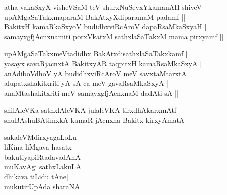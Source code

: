 \begin{entry}
\begin{shl}
atha vakaSxyX visheVSaM teV shurxNuSevxYkamanAH shiveV |\\
upAMgaSaTakxmaparaM BakAtxyXdiparamaM padamf ||\\
BakitxH kamaRkaSxyoV budidhxviRcAroV dapaRsaMkaSxyaH |\\
samayxgfjAcnxnamiti porxVkatxM sathxlaSaTakxM mama pirxyamf ||
\end{shl}
\begin{shl}
upAMgaSaTakxmeVtadidhx BakAtxdisathxlaSaTakxkamf |\\
yasayx savaRjacnxtA BakitxyAR taqpitxH kamaRsaMkaSxyA |\\
anAdiboVdhoV yA budidhxviRcAroV meV savxtaMtarxtA ||\\
alupatxshakitxriti yA sA ca meV gavaRsaMkaSxyA |\\
anaMtashakitxriti meV samayxgfjAcnxnaM dadAti sA ||
\end{shl}
\end{entry}

\begin{entry}
\begin{shl}
shilAleVKa sathxlAleVKA julaleVKA tirxdhAkarxmAtf\\
shuBAshuBAtimxkA kamaR jAcnxna Bakitx kirxyAmatA
\end{shl}
\end{entry}

\begin{entry}
\begin{shl}
sakaleVMdirxyagaLoLu\\
liKina liMgava hasatx\\
bakutiyapiRtadavadAnA\\
muKavAgi sathxLakuLA\\
dhikava tiLidu tAne|\\
mukutirUpAda sharaNA 
\end{shl}
\end{entry}

